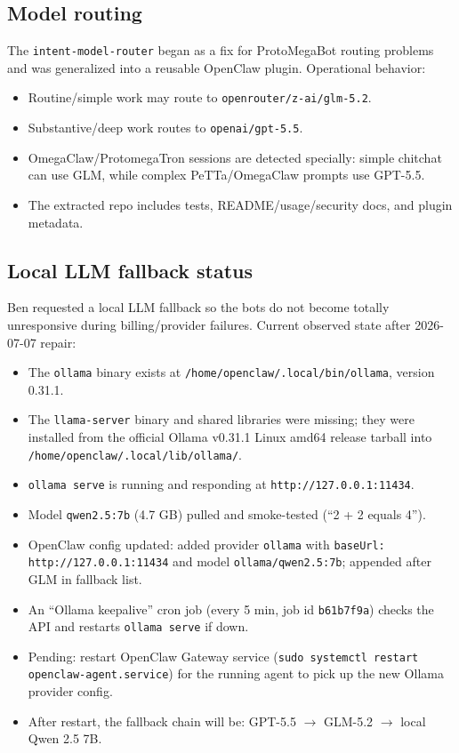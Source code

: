 \documentclass[11pt]{article}
\begin{document}
\subsection{Model routing}

The \texttt{intent-model-router} began as a fix for ProtoMegaBot routing problems and was generalized into a reusable OpenClaw plugin.  Operational behavior:
\begin{itemize}
  \item Routine/simple work may route to \texttt{openrouter/z-ai/glm-5.2}.
  \item Substantive/deep work routes to \texttt{openai/gpt-5.5}.
  \item OmegaClaw/ProtomegaTron sessions are detected specially: simple chitchat can use GLM, while complex PeTTa/OmegaClaw prompts use GPT-5.5.
  \item The extracted repo includes tests, README/usage/security docs, and plugin metadata.
\end{itemize}

\subsection{Local LLM fallback status}

Ben requested a local LLM fallback so the bots do not become totally unresponsive during billing/provider failures.  Current observed state after 2026-07-07 repair:
\begin{itemize}
  \item The \texttt{ollama} binary exists at \texttt{/home/openclaw/.local/bin/ollama}, version 0.31.1.
  \item The \texttt{llama-server} binary and shared libraries were missing; they were installed from the official Ollama v0.31.1 Linux amd64 release tarball into \texttt{/home/openclaw/.local/lib/ollama/}.
  \item \texttt{ollama serve} is running and responding at \texttt{http://127.0.0.1:11434}.
  \item Model \texttt{qwen2.5:7b} (4.7 GB) pulled and smoke-tested (``2 + 2 equals 4'').
  \item OpenClaw config updated: added provider \texttt{ollama} with \texttt{baseUrl: http://127.0.0.1:11434} and model \texttt{ollama/qwen2.5:7b}; appended after GLM in fallback list.
  \item An ``Ollama keepalive'' cron job (every 5 min, job id \texttt{b61b7f9a}) checks the API and restarts \texttt{ollama serve} if down.
  \item Pending: restart OpenClaw Gateway service (\texttt{sudo systemctl restart openclaw-agent.service}) for the running agent to pick up the new Ollama provider config.
  \item After restart, the fallback chain will be: GPT-5.5 $\to$ GLM-5.2 $\to$ local Qwen 2.5 7B.
\end{itemize}
\end{document}
